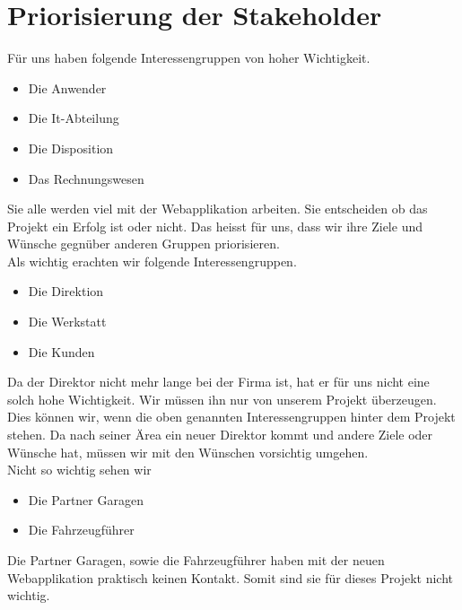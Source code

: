 \section{Priorisierung der Stakeholder}
Für uns haben folgende Interessengruppen von hoher Wichtigkeit.
\begin{itemize}
\item Die Anwender
\item Die It-Abteilung
\item Die Disposition
\item Das Rechnungswesen
\end{itemize}
%
Sie alle werden viel mit der Webapplikation arbeiten. Sie entscheiden ob das Projekt ein Erfolg ist oder nicht. Das heisst für uns, dass wir ihre Ziele und Wünsche gegnüber anderen Gruppen priorisieren.\\[2ex]
%
Als wichtig erachten wir folgende Interessengruppen.
\begin{itemize}
\item Die Direktion
\item Die Werkstatt
\item Die Kunden
\end{itemize}
%
Da der Direktor nicht mehr lange bei der Firma ist, hat er für uns nicht eine solch hohe Wichtigkeit. Wir müssen ihn nur von unserem Projekt überzeugen. Dies können wir, wenn die oben genannten Interessengruppen hinter dem Projekt stehen. Da nach seiner Ärea ein neuer Direktor kommt und andere Ziele oder Wünsche hat, müssen wir mit den Wünschen vorsichtig umgehen.\\[2ex]
%
Nicht so wichtig sehen wir
\begin{itemize}
\item Die Partner Garagen
\item Die Fahrzeugführer
\end{itemize}
%
Die Partner Garagen, sowie die Fahrzeugführer haben mit der neuen Webapplikation praktisch keinen Kontakt. Somit sind sie für dieses Projekt nicht wichtig.